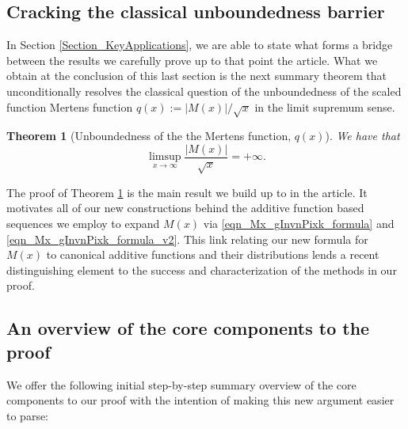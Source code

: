 \documentclass[11pt,reqno,a4letter]{article}
\numberwithin{figure}{section}
\numberwithin{table}{section}
\theoremstyle{plain}
\newtheorem{theorem}{Theorem}
\numberwithin{theorem}{section}
\theoremstyle{definition}
\begin{document}
\subsection{Cracking the classical unboundedness barrier} 

In Section \ref{Section_KeyApplications}, 
we are able to state what forms a bridge between the results 
we carefully prove up to that point the article. 
What we obtain at the conclusion of this last section 
is the next summary theorem that unconditionally 
resolves the classical question of the 
unboundedness of the scaled function Mertens function 
$q(x) := |M(x)| / \sqrt{x}$ in the limit supremum sense. 

\begin{theorem}[Unboundedness of the the Mertens function, $q(x)$] 
\label{cor_ThePipeDreamResult_v1} 
We have that 
\[
\limsup_{x \rightarrow \infty} \frac{|M(x)|}{\sqrt{x}} = +\infty. 
\]
\end{theorem} 

The proof of Theorem \ref{cor_ThePipeDreamResult_v1} is 
the main result we build up to in the article. 
It motivates all of our new constructions behind the additive function based 
sequences we employ to expand $M(x)$ via 
\eqref{eqn_Mx_gInvnPixk_formula} and 
\eqref{eqn_Mx_gInvnPixk_formula_v2}. 
This link relating our new formula for $M(x)$ 
to canonical additive functions and their 
distributions lends a recent distinguishing element to the 
success and characterization of the methods in our proof. 

\subsection{An overview of the core components to the proof} 

We offer the following initial step-by-step summary overview of the core components 
to our proof with the intention of making this new argument easier to parse: 
\end{document}

